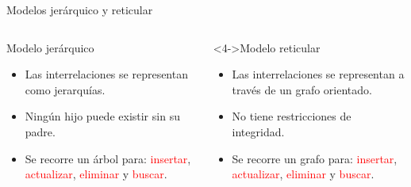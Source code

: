 \begin{frame}{Modelos jer\'arquico y reticular}
    \begin{columns}
        \begin{column}[t]{.5\textwidth}
            \begin{block}{Modelo jer\'arquico}
                \begin{itemize}[<+->]
                \item Las interrelaciones se representan como jerarqu\'ias.
                \item Ning\'un hijo puede existir sin su padre.
                \item Se recorre un \'arbol para: \textcolor<7>{red}{insertar}, \textcolor<7>{red}{actualizar}, \textcolor<7>{red}{eliminar} y \textcolor<7>{red}{buscar}.
                \end{itemize}
            \end{block}
        \end{column}

        \begin{column}[t]{.5\textwidth}
            \begin{block}<4->{Modelo reticular}
                \begin{itemize}[<+->]
                \item Las interrelaciones se representan a trav\'es de un grafo orientado.
                \item No tiene restricciones de integridad.
                \item Se recorre un grafo para: \textcolor<7>{red}{insertar}, \textcolor<7>{red}{actualizar}, \textcolor<7>{red}{eliminar} y \textcolor<7>{red}{buscar}.
                \end{itemize}
            \end{block}
        \end{column}
    \end{columns}
\end{frame}

